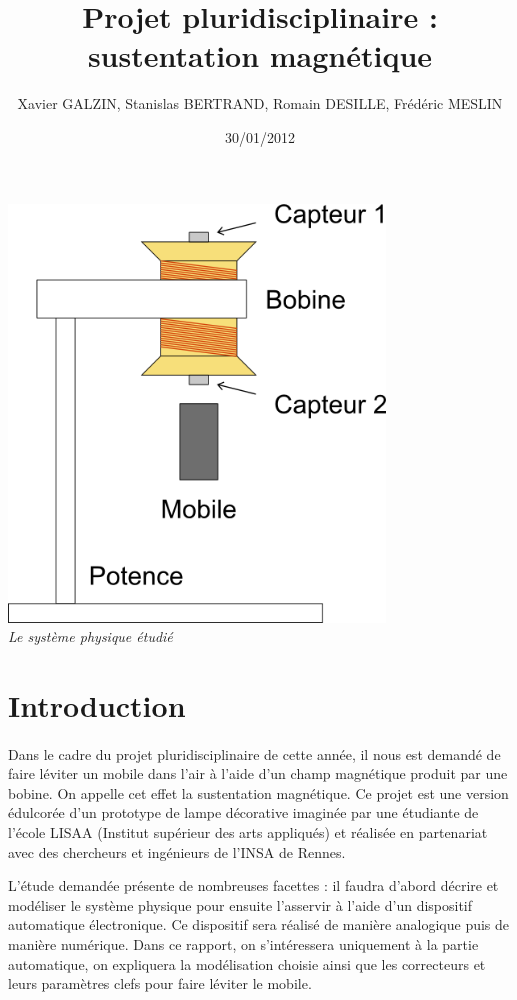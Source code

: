 \documentclass[11pt, french]{article} %
\title{Projet pluridisciplinaire : sustentation magnétique}
\author{Xavier GALZIN, Stanislas BERTRAND, Romain DESILLE, Frédéric MESLIN}
\date{30/01/2012}
\begin{document}
\maketitle

\begin{center}
	\vspace{0.6in}
	\includegraphics[width=10cm]{Automatique/system_physique.png} 
	\\
	\emph{Le système physique étudié}
\end{center}

\pagebreak

\section{Introduction}
\paragraph{}
Dans le cadre du projet pluridisciplinaire de cette année, il nous est demandé de faire léviter un mobile dans l'air à l'aide d'un champ magnétique produit par une bobine. On appelle cet effet la sustentation magnétique. Ce projet est une version édulcorée d'un prototype de lampe décorative imaginée par une étudiante de l'école LISAA (Institut supérieur des arts appliqués) et réalisée en partenariat avec des chercheurs et ingénieurs de l'INSA de Rennes.

L'étude demandée présente de nombreuses facettes : il faudra d'abord décrire et modéliser le système physique pour ensuite l'asservir à l'aide d'un dispositif automatique électronique. Ce dispositif sera réalisé de manière analogique puis de manière numérique. Dans ce rapport, on s'intéressera uniquement à la partie automatique, on expliquera la modélisation choisie ainsi que les correcteurs et leurs paramètres clefs pour faire léviter le mobile.
\end{document}

